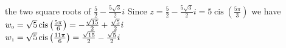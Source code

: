 { the two square roots of $\frac{5}{2} - \frac{5\sqrt{3}}{2}i$}
{ Since $z=\frac{5}{2} - \frac{5\sqrt{3}}{2}i = 5\operatorname{cis}\left(\frac{5\pi}{3}\right)$ we have \\$w_{\text{\tiny$0$}} =\sqrt{5}\operatorname{cis}\left(\frac{5\pi}{6}\right) = -\frac{\sqrt{15}}{2} + \frac{\sqrt{5}}{2}i$\\$w_{\text{\tiny$1$}} = \sqrt{5}\operatorname{cis}\left(\frac{11\pi}{6}\right) = \frac{\sqrt{15}}{2} - \frac{\sqrt{5}}{2}i$}
